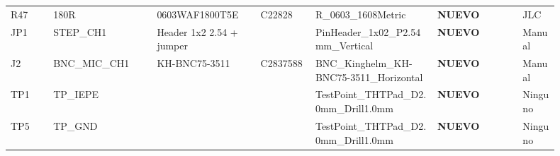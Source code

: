 \documentclass[10pt,a4paper]{article}
\begin{document}
{\begin{longtable}{@{}L{0.07\linewidth}L{0.17\linewidth}L{0.17\linewidth}L{0.09\linewidth}L{0.20\linewidth}L{0.14\linewidth}L{0.06\linewidth}@{}}
R47 & 180R & 0603WAF1800T5E & C22828 & R\_\allowbreak{}0603\_\allowbreak{}1608Metric & \textbf{NUEVO} & JLC\\
JP1 & STEP\_\allowbreak{}CH1 & Header 1x2 2.54 + jumper &  & PinHeader\_\allowbreak{}1x02\_\allowbreak{}P2.54mm\_\allowbreak{}Vertical & \textbf{NUEVO} & Manual\\
J2 & BNC\_\allowbreak{}MIC\_\allowbreak{}CH1 & KH-BNC75-3511 & C2837588 & BNC\_\allowbreak{}Kinghelm\_\allowbreak{}KH-BNC75-3511\_\allowbreak{}Horizontal & \textbf{NUEVO} & Manual\\
TP1 & TP\_\allowbreak{}IEPE &  &  & TestPoint\_\allowbreak{}THTPad\_\allowbreak{}D2.0mm\_\allowbreak{}Drill1.0mm & \textbf{NUEVO} & Ninguno\\
TP5 & TP\_\allowbreak{}GND &  &  & TestPoint\_\allowbreak{}THTPad\_\allowbreak{}D2.0mm\_\allowbreak{}Drill1.0mm & \textbf{NUEVO} & Ninguno\\
\bottomrule\end{longtable}}
\end{document}
